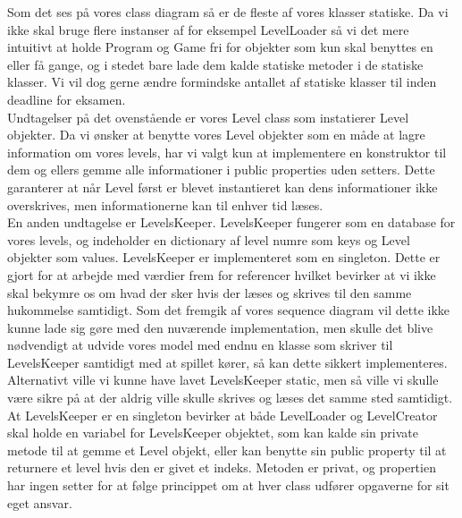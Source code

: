 Som det ses på vores class diagram så er de fleste af vores klasser statiske. Da vi ikke skal bruge flere instanser af for eksempel LevelLoader så vi det mere intuitivt at holde Program og Game fri for objekter som kun skal benyttes en eller få gange, og i stedet bare lade dem kalde statiske metoder i de statiske klasser. Vi vil dog gerne ændre formindske antallet af statiske klasser til inden deadline for eksamen.\\
Undtagelser på det ovenstående er vores Level class som instatierer Level objekter. Da vi ønsker at benytte vores Level objekter som en måde at lagre information om vores levels, har vi valgt kun at implementere en konstruktor til dem og ellers gemme alle informationer i public properties uden setters. Dette garanterer at når Level først er blevet instantieret kan dens informationer ikke overskrives, men informationerne kan til enhver tid læses.\\
En anden undtagelse er LevelsKeeper. LevelsKeeper fungerer som en database for vores levels, og indeholder en dictionary af level numre som keys og Level objekter som values. LevelsKeeper er implementeret som en singleton. Dette er gjort for at arbejde med værdier frem for referencer hvilket bevirker at vi ikke skal bekymre os om hvad der sker hvis der læses og skrives til den samme hukommelse samtidigt. Som det fremgik af vores sequence diagram vil dette ikke kunne lade sig gøre med den nuværende implementation, men skulle det blive nødvendigt at udvide vores model med endnu en klasse som skriver til LevelsKeeper samtidigt med at spillet kører, så kan dette sikkert implementeres. Alternativt ville vi kunne have lavet LevelsKeeper static, men så ville vi skulle være sikre på at der aldrig ville skulle skrives og læses det samme sted samtidigt.\\
At LevelsKeeper er en singleton bevirker at både LevelLoader og LevelCreator skal holde en variabel for LevelsKeeper objektet, som kan kalde sin private metode til at gemme et Level objekt, eller kan benytte sin public property til at returnere et level hvis den er givet et indeks. Metoden er privat, og propertien har ingen setter for at følge princippet om at hver class udfører opgaverne for sit eget ansvar.
